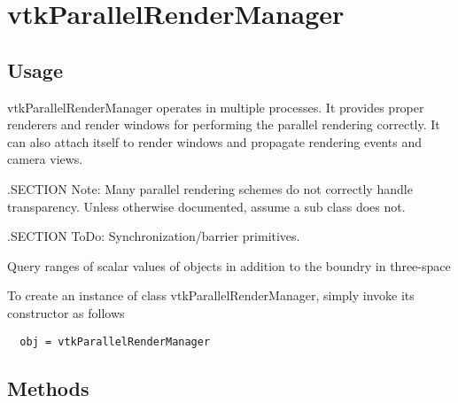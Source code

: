 \section{vtkParallelRenderManager}

\subsection{Usage}

 vtkParallelRenderManager operates in multiple processes.  It provides
 proper renderers and render windows for performing the parallel
 rendering correctly.  It can also attach itself to render windows and
 propagate rendering events and camera views.

 .SECTION Note:
 Many parallel rendering schemes do not correctly handle transparency.
 Unless otherwise documented, assume a sub class does not.

 .SECTION ToDo:
 Synchronization/barrier primitives.

 Query ranges of scalar values of objects in addition to the boundry in
 three-space


To create an instance of class vtkParallelRenderManager, simply
invoke its constructor as follows
\begin{verbatim}
  obj = vtkParallelRenderManager
\end{verbatim}
\subsection{Methods}

